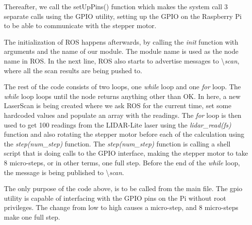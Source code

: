 Thereafter, we call the setUpPins() function which makes the system call 3 separate calls using the GPIO utility, setting up the GPIO on the Raspberry Pi to be able to communicate with the stepper motor.

The initialization of ROS happens afterwards, by calling the \textit{init} function with arguments and the name of our module. The module name is used as the node name in ROS. In the next line, ROS also starts to advertise messages to \textbackslash\textit{scan}, where all the scan results are being pushed to.

The rest of the code consists of two loops, one \textit{while} loop and one \textit{for} loop. The \textit{while} loop loops until the node returns anything other than OK. In here, a new LaserScan is being created where we ask ROS for the current time, set some hardcoded values and populate an array with the readings. The \textit{for} loop is then used to get 100 readings from the LIDAR-Lite laser using the \textit{lidar\_read(fs)} function and also rotating the stepper motor before each of the calculation using the \textit{step(num\_step)} function. The \textit{step(num\_step)} function is calling a shell script that is doing calls to the GPIO interface, making the stepper motor to take 8 micro-steps, or in other terms, one full step. Before the end of the \textit{while} loop, the message is being published to \textbackslash\textit{scan}.



The only purpose of the code above, is to be called from the main file. The gpio utility is capable of interfacing with the GPIO pins on the Pi without root privileges. The change from low to high causes a micro-step, and 8 micro-steps make one full step.
